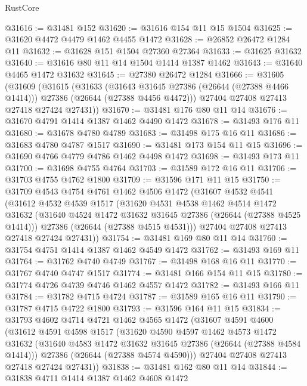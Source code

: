 \begin{lexlean}{RustCore}
\begin{coremodule}
@31616 := @31481 @152
@31620 := @31616 @154 @11 @15 @1504
@31625 := @31620 @4472 @4479 @1462 @4455 @1472
@31628 := @26852 @26472 @1284 @11
@31632 := @31628 @151 @1504 @27360 @27364
@31633 := @31625 @31632
@31640 := @31616 @80 @11 @14 @1504 @1414 @1387 @1462
@31643 := @31640 @4465 @1472 @31632
@31645 := @27380 @26472 @1284
@31666 := @31605
    (@31609
      (@31615
        (@31633
          (@31643 @31645 @27386 (@26644 (@27388 @4466 @1414)))
          @27386
          (@26644 (@27388 @4456 @4472)))
        @27404
        @27408
        @27413
        @27418
        @27424
        @27431))
@31670 := @31481 @176 @80 @11 @14
@31676 := @31670 @4791 @1414 @1387 @1462 @4490 @1472
@31678 := @31493 @176 @11
@31680 := @31678 @4780 @4789
@31683 := @31498 @175 @16 @11
@31686 := @31683 @4780 @4787 @1517
@31690 := @31481 @173 @154 @11 @15
@31696 := @31690 @4766 @4779 @4786 @1462 @4498 @1472
@31698 := @31493 @173 @11
@31700 := @31698 @4755 @4764
@31703 := @31589 @172 @16 @11
@31706 := @31703 @4755 @4762 @1800
@31709 := @31596 @171 @11 @15
@31750 := @31709
    @4543
    @4754
    @4761
    @1462
    @4506
    @1472
    (@31607
      @4532
      @4541
      (@31612
        @4532
        @4539
        @1517
        (@31620
          @4531
          @4538
          @1462
          @4514
          @1472
          @31632
          (@31640 @4524 @1472 @31632 @31645 @27386 (@26644 (@27388 @4525 @1414)))
          @27386
          (@26644 (@27388 @4515 @4531)))
        @27404
        @27408
        @27413
        @27418
        @27424
        @27431))
@31754 := @31481 @169 @80 @11 @14
@31760 := @31754 @4751 @1414 @1387 @1462 @4549 @1472
@31762 := @31493 @169 @11
@31764 := @31762 @4740 @4749
@31767 := @31498 @168 @16 @11
@31770 := @31767 @4740 @4747 @1517
@31774 := @31481 @166 @154 @11 @15
@31780 := @31774 @4726 @4739 @4746 @1462 @4557 @1472
@31782 := @31493 @166 @11
@31784 := @31782 @4715 @4724
@31787 := @31589 @165 @16 @11
@31790 := @31787 @4715 @4722 @1800
@31793 := @31596 @164 @11 @15
@31834 := @31793
    @4602
    @4714
    @4721
    @1462
    @4565
    @1472
    (@31607
      @4591
      @4600
      (@31612
        @4591
        @4598
        @1517
        (@31620
          @4590
          @4597
          @1462
          @4573
          @1472
          @31632
          (@31640 @4583 @1472 @31632 @31645 @27386 (@26644 (@27388 @4584 @1414)))
          @27386
          (@26644 (@27388 @4574 @4590)))
        @27404
        @27408
        @27413
        @27418
        @27424
        @27431))
@31838 := @31481 @162 @80 @11 @14
@31844 := @31838 @4711 @1414 @1387 @1462 @4608 @1472

\end{coremodule}
\end{lexlean}
